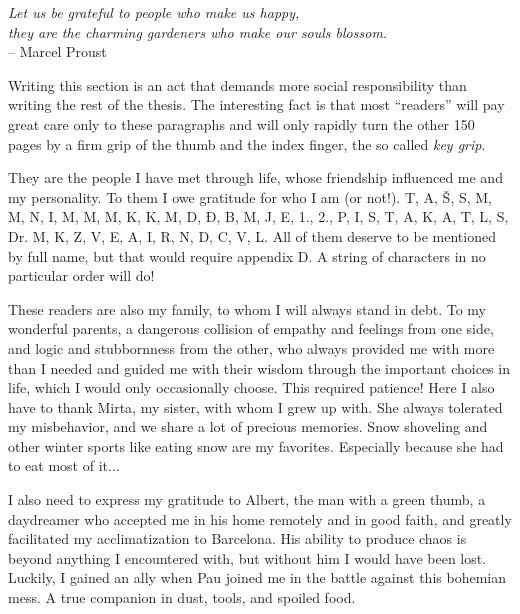 \cleardoublepage

{}

\begin{acknowledgements}

\narrowlinespacing
\begin{myquote}
\begin{flushright}
\textit{Let us be grateful to people who make us happy,\\they are the charming gardeners who make our souls blossom.} \\-- Marcel Proust
\end{flushright}
\end{myquote}
\normallinespacing

Writing this section is an act that demands more social responsibility than writing the rest of the thesis. The interesting fact is that most “readers” will pay great care only to these paragraphs and will only rapidly turn the other 150 pages by a firm grip of the thumb and the index finger, the so called \emph{key grip}.

They are the people I have met through life, whose friendship influenced me and my personality. To them I owe gratitude for who I am (or not!). T, A, Š, S, M, M, N, I, M, M, M, K, K, M, D, Đ, B, M, J, E, 1., 2., P, I, S, T, A, K, A, T, L, S, Dr. M, K, Z, V, E, A, I, R, N, D, C, V, L. All of them deserve to be mentioned by full name, but that would require appendix D. A string of characters in no particular order will do!

These readers are also my family, to whom I will always stand in debt. To my wonderful parents, a dangerous collision of empathy and feelings from one side, and logic and stubbornness from the other, who always provided me with more than I needed and guided me with their wisdom through the important choices in life, which I would only occasionally choose. This required patience! Here I also have to thank Mirta, my sister, with whom I grew up with. She always tolerated my misbehavior, and we share a lot of precious memories. Snow shoveling and other winter sports like eating snow are my favorites. Especially because she had to eat most of it...

I also need to express my gratitude to Albert, the man with a green thumb, a daydreamer who accepted me in his home remotely and in good faith, and greatly facilitated my acclimatization to Barcelona. His ability to produce chaos is beyond anything I encountered with, but without him I would have been lost. Luckily, I gained an ally when Pau joined me in the battle against this bohemian mess. A true companion in dust, tools, and spoiled food.


\end{acknowledgements}
